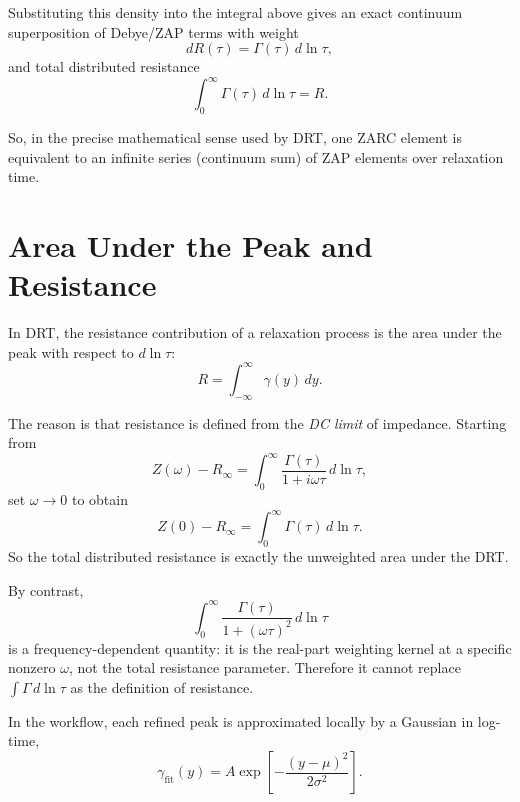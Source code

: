 \documentclass[11pt]{article}
\begin{document}
Substituting this density into the integral above gives an exact continuum superposition of Debye/ZAP terms with weight
\begin{equation}
dR(\tau)=\Gamma(\tau)\,d\ln\tau,
\end{equation}
and total distributed resistance
\begin{equation}
\int_0^{\infty}\Gamma(\tau)\,d\ln\tau=R.
\end{equation}

So, in the precise mathematical sense used by DRT, one ZARC element is equivalent to an infinite series (continuum sum) of ZAP elements over relaxation time.

\section{Area Under the Peak and Resistance}

In DRT, the resistance contribution of a relaxation process is the area under the peak with respect to $d\ln\tau$:
\begin{equation}
R = \int_{-\infty}^{\infty} \gamma(y) \, dy.
\end{equation}

The reason is that resistance is defined from the \emph{DC limit} of impedance. Starting from
\begin{equation}
Z(\omega)-R_\infty = \int_0^\infty \frac{\Gamma(\tau)}{1+i\omega\tau}\,d\ln\tau,
\end{equation}
set $\omega \to 0$ to obtain
\begin{equation}
Z(0)-R_\infty = \int_0^\infty \Gamma(\tau)\,d\ln\tau.
\end{equation}
So the total distributed resistance is exactly the unweighted area under the DRT.

By contrast,
\begin{equation}
\int_0^\infty \frac{\Gamma(\tau)}{1+(\omega\tau)^2}\,d\ln\tau
\end{equation}
is a frequency-dependent quantity: it is the real-part weighting kernel at a specific nonzero $\omega$, not the total resistance parameter. Therefore it cannot replace $\int \Gamma\,d\ln\tau$ as the definition of resistance.

In the workflow, each refined peak is approximated locally by a Gaussian in log-time,
\begin{equation}
\gamma_{\mathrm{fit}}(y) = A \exp\left[-\frac{(y-\mu)^2}{2\sigma^2}\right].
\end{equation}
\end{document}
